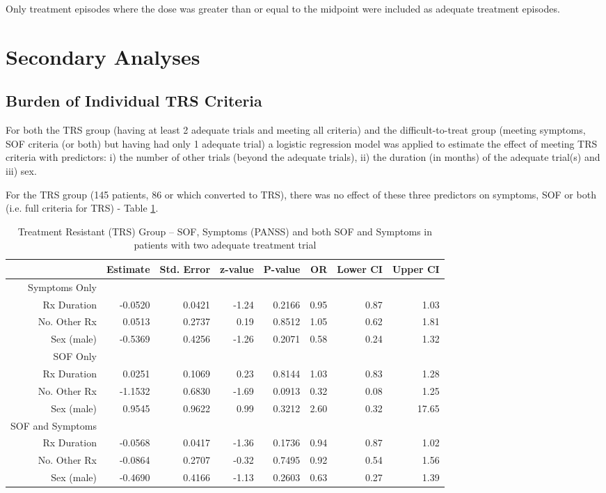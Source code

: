 \documentclass[a4paper,nobib]{article}
\begin{document}
Only treatment episodes where the dose was greater than or equal to the midpoint were included as adequate treatment episodes.  

\section{Secondary Analyses}
\subsection{Burden of Individual TRS Criteria}
For both the TRS group (having at least 2 adequate trials and meeting all criteria) and the difficult-to-treat group (meeting symptoms, SOF criteria (or both) but having had only 1 adequate trial) a logistic regression model was applied to estimate the effect of meeting TRS criteria with predictors: i) the number of other trials (beyond the adequate trials), ii) the duration (in months) of the adequate trial(s) and iii) sex.

For the TRS group (145 patients, 86 or which converted to TRS), there was no effect of these three predictors on symptoms, SOF or both (i.e. full criteria for TRS) - Table \ref{tab-both-glm-TRS}.

\begin{table}[!h]
\begin{center}
\begin{tabular}{rrrrrrrr}
\hline
& Estimate & Std. Error & z-value & P-value & OR & Lower CI & Upper CI \\ 
\hline
Symptoms Only\\
\hline
Rx Duration & -0.0520 & 0.0421 & -1.24 & 0.2166 & 0.95 & 0.87 & 1.03\\ 
No. Other Rx& 0.0513  & 0.2737 & 0.19  & 0.8512 & 1.05 & 0.62 & 1.81\\ 
Sex (male)  &-0.5369  & 0.4256 &-1.26  & 0.2071 & 0.58 & 0.24 & 1.32\\ 
\hline
SOF Only\\
\hline
Rx Duration & 0.0251 & 0.1069 & 0.23 & 0.8144 & 1.03 & 0.83 & 1.28\\ 
No. Other Rx&-1.1532 & 0.6830 &-1.69 & 0.0913 & 0.32 & 0.08 & 1.25\\ 
Sex (male)  & 0.9545 & 0.9622 & 0.99 & 0.3212 & 2.60 & 0.32 & 17.65\\
\hline
SOF and Symptoms\\
\hline
Rx Duration & -0.0568 & 0.0417 & -1.36 & 0.1736 & 0.94 & 0.87 & 1.02\\ 
No. Other Rx& -0.0864 & 0.2707 & -0.32 & 0.7495 & 0.92 & 0.54 & 1.56\\ 
Sex (male)  & -0.4690 & 0.4166 & -1.13 & 0.2603 & 0.63 & 0.27 & 1.39\\ 
\hline
\end{tabular}
\end{center}
\caption{Treatment Resistant (TRS) Group -- SOF, Symptoms (PANSS) and both SOF and Symptoms in patients with two adequate treatment trial}
\label{tab-both-glm-TRS}
\end{table}
\end{document}
